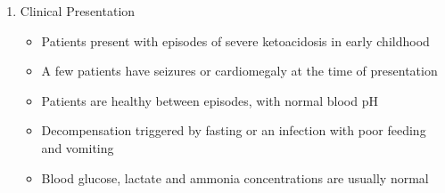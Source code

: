 \documentclass{scrartcl}
\begin{document}
\begin{enumerate}
\item Clinical Presentation
\label{sec:org6d4d8e1}
\begin{itemize}
\item Patients present with episodes of severe ketoacidosis in early childhood
\item A few patients have seizures or cardiomegaly at the time of presentation
\item Patients are healthy between episodes, with normal blood pH
\item Decompensation triggered by fasting or an infection with poor
feeding and vomiting
\item Blood glucose, lactate and ammonia concentrations are usually normal
\end{itemize}


\end{enumerate}
\end{document}

